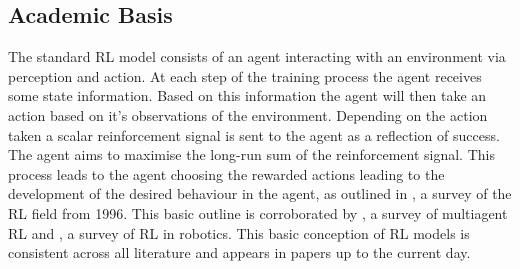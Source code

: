 \documentclass[hidelinks,journal]{IEEEtran}
\begin{document}
\subsection{Academic Basis}
\label{subsec:lrAcademicBasis}
The standard RL model consists of an agent interacting with an environment via perception and action. At each step of the training process the agent receives some state information. Based on this information the agent will then take an action based on it's observations of the environment. Depending on the action taken a scalar reinforcement signal is sent to the agent as a reflection of success. The agent aims to maximise the long-run sum of the reinforcement signal. This process leads to the agent choosing the rewarded actions leading to the development of the desired behaviour in the agent, as outlined in \textcite{Kaelbling96}, a survey of the RL field from 1996. This basic outline is corroborated by \textcite{Busoniu08}, a survey of multiagent RL and \textcite{Kober13}, a survey of RL in robotics. This basic conception of RL models is consistent across all literature and appears in papers up to the current day.
\end{document}
